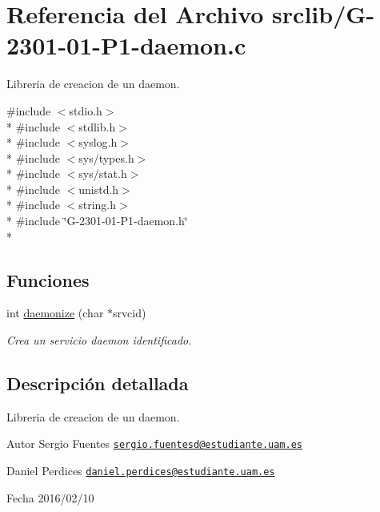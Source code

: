 \hypertarget{G-2301-01-P1-daemon_8c}{}\section{Referencia del Archivo srclib/\+G-\/2301-\/01-\/\+P1-\/daemon.c}
\label{G-2301-01-P1-daemon_8c}


Libreria de creacion de un daemon.  


{\ttfamily \#include $<$stdio.\+h$>$}\\*
{\ttfamily \#include $<$stdlib.\+h$>$}\\*
{\ttfamily \#include $<$syslog.\+h$>$}\\*
{\ttfamily \#include $<$sys/types.\+h$>$}\\*
{\ttfamily \#include $<$sys/stat.\+h$>$}\\*
{\ttfamily \#include $<$unistd.\+h$>$}\\*
{\ttfamily \#include $<$string.\+h$>$}\\*
{\ttfamily \#include \char`\"{}G-\/2301-\/01-\/\+P1-\/daemon.\+h\char`\"{}}\\*
\subsection*{Funciones}
\begin{DoxyCompactItemize}
\item 
int \hyperlink{G-2301-01-P1-daemon_8c_ad8e1416e1d2423a40411b977ae5ba468}{daemonize} (char $\ast$srvcid)
\begin{DoxyCompactList}\small\item\em Crea un servicio daemon identificado. \end{DoxyCompactList}\end{DoxyCompactItemize}


\subsection{Descripción detallada}
Libreria de creacion de un daemon. 

\begin{DoxyAuthor}{Autor}
Sergio Fuentes \href{mailto:sergio.fuentesd@estudiante.uam.es}{\tt sergio.\+fuentesd@estudiante.\+uam.\+es} 

Daniel Perdices \href{mailto:daniel.perdices@estudiante.uam.es}{\tt daniel.\+perdices@estudiante.\+uam.\+es} 
\end{DoxyAuthor}
\begin{DoxyDate}{Fecha}
2016/02/10 
\end{DoxyDate}



